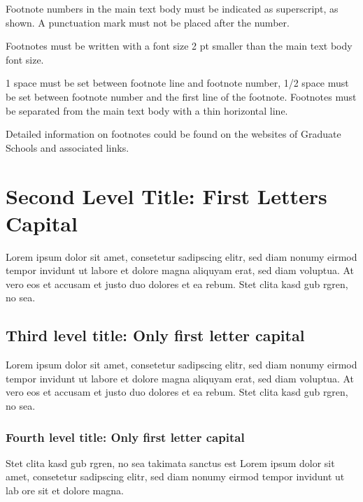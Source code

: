 Footnote numbers in the main text body must be indicated as superscript, as shown\footnotemark. A punctuation mark must not be placed after the number.

Footnotes must be written with a font size 2 pt smaller than the main text body font size.
 
1 space must be set between footnote line and footnote number, 1/2 space must be set between footnote number and the first line of the footnote. Footnotes must be separated from the main text body with a thin horizontal line. 

Detailed information on footnotes could be found on the websites of Graduate Schools and associated links.


\section{Second Level Title: First Letters Capital}

Lorem ipsum dolor sit amet, consetetur sadipscing elitr, sed diam nonumy eirmod tempor invidunt ut labore et dolore magna aliquyam erat, sed diam voluptua. At vero eos et accusam et justo duo dolores et ea rebum. Stet clita kasd gub rgren, no sea. 

\subsection{Third level title: Only first letter capital}

Lorem ipsum dolor sit amet, consetetur sadipscing elitr, sed diam nonumy eirmod tempor invidunt ut labore et dolore magna aliquyam erat, sed diam voluptua. At vero eos et accusam et justo duo dolores et ea rebum. Stet clita kasd gub rgren, no sea. 

\subsubsection{Fourth level title: Only first letter capital}

Stet clita kasd gub rgren, no sea takimata sanctus est Lorem ipsum dolor sit amet, consetetur sadipscing elitr, sed diam nonumy eirmod tempor invidunt ut lab ore sit et dolore magna.

